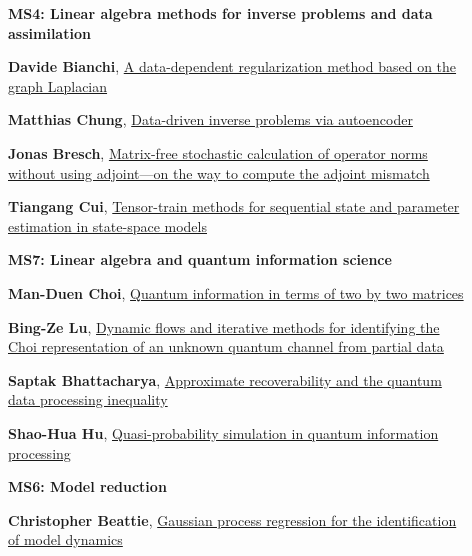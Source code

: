 \documentclass[ILAS2025-program.tex]{subfiles}
\begin{document}
\begin{description}
    \begin{description}
    \item[] {\color{mstitle}\textbf{MS4: Linear algebra methods for inverse problems and data assimilation}} 
    \item[] \hypertarget{up0201}{}\textbf{Davide Bianchi}, \hyperlink{down0201}{A data-dependent regularization method based on the graph Laplacian}
        \item[] \hypertarget{up0202}{}\textbf{Matthias Chung}, \hyperlink{down0202}{Data-driven inverse problems via autoencoder
}
        \item[] \hypertarget{up0203}{}\textbf{Jonas Bresch}, \hyperlink{down0203}{Matrix-free stochastic calculation of operator norms without using adjoint---on the way to compute the adjoint mismatch}
        \item[] \hypertarget{up0204}{}\textbf{Tiangang Cui}, \hyperlink{down0204}{Tensor-train methods for sequential state and parameter estimation in state-space models
}
        \end{description}
    \begin{description}
    \item[] {\color{mstitle}\textbf{MS7: Linear algebra and quantum information science}} 
    \item[] \hypertarget{up0205}{}\textbf{Man-Duen Choi}, \hyperlink{down0205}{Quantum information in terms of two by two matrices}
        \item[] \hypertarget{up0206}{}\textbf{Bing-Ze Lu}, \hyperlink{down0206}{Dynamic flows and iterative methods for identifying the Choi representation of an unknown quantum channel from partial data
}
        \item[] \hypertarget{up0207}{}\textbf{Saptak Bhattacharya}, \hyperlink{down0207}{Approximate recoverability and the quantum data processing inequality}
        \item[] \hypertarget{up0208}{}\textbf{Shao-Hua Hu}, \hyperlink{down0208}{Quasi-probability simulation in quantum information processing}
        \end{description}
    \begin{description}
    \item[] {\color{mstitle}\textbf{MS6: Model reduction}} 
    \item[] \hypertarget{up0209}{}\textbf{Christopher Beattie}, \hyperlink{down0209}{Gaussian process regression for the identification of model dynamics}

\end{description}
\end{description}
\end{document}
